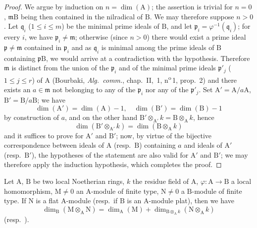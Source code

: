 \begin{proof}
We argue by induction on $n=\dim(\mathrm{A})$; the assertion is trivial for $n=0$, $\mathfrak{m}\mathrm{B}$ being then contained in the nilradical of $\mathrm{B}$.
We may therefore suppose $n>0$.
Let $\mathfrak{q}_i$ ($1\leqslant i\leqslant m$) be the minimal prime ideals of $\mathrm{B}$, and let $\mathfrak{p}_i=\varphi^{-1}(\mathfrak{q}_i)$; for every $i$, we have $\mathfrak{p}_i\neq\mathfrak{m}$; otherwise (since $n>0$) there would exist a prime ideal $\mathfrak{p}\neq\mathfrak{m}$ contained in $\mathfrak{p}_i$ and as $\mathfrak{q}_i$ is minimal among the prime ideals of $\mathrm{B}$ containing $\mathfrak{p}\mathrm{B}$, we would arrive at a contradiction with the hypothesis.
Therefore $\mathfrak{m}$ is distinct from the union of the $\mathfrak{p}_i$ and of the minimal prime ideals $\mathfrak{p}'_j$ ($1\leqslant j\leqslant r$) of $\mathrm{A}$ (Bourbaki, \emph{Alg.\ comm.}, chap.~II, \textsection\,1, n\textsuperscript{o}\,1, prop.~2) and there exists an $a\in\mathfrak{m}$ not belonging to any of the $\mathfrak{p}_i$ nor any of the $\mathfrak{p}'_j$.
Set $\mathrm{A}'=\mathrm{A}/a\mathrm{A}$, $\mathrm{B}'=\mathrm{B}/a\mathrm{B}$; we have 
\[
  \dim(\mathrm{A}')=\dim(\mathrm{A})-1,\quad
  \dim(\mathrm{B}')=\dim(\mathrm{B})-1
\]
by construction of $a$, and on the other hand $\mathrm{B}'\otimes_{\mathrm{A}'}k=\mathrm{B}\otimes_\mathrm{A} k$, hence
\[
  \dim(\mathrm{B}'\otimes_{\mathrm{A}'}k)=\dim(\mathrm{B}\otimes_\mathrm{A} k)
\]
and it suffices to prove  for $\mathrm{A}'$ and $\mathrm{B}'$; now, by virtue of the bijective correspondence between ideals of $\mathrm{A}$ (resp.\ $\mathrm{B}$) containing $a$ and ideals of $\mathrm{A}'$ (resp.\ $\mathrm{B}'$), the hypotheses of the statement are also valid for $\mathrm{A}'$ and $\mathrm{B}'$; we may therefore apply the induction hypothesis, which completes the proof.
\end{proof}

\begin{corollary}[6.1.2]
\label{IV.6.1.2}
Let $\mathrm{A}$, $\mathrm{B}$ be two local Noetherian rings, $k$ the residue field of $\mathrm{A}$, $\varphi:\mathrm{A}\to\mathrm{B}$ a local homomorphism, $\mathrm{M}\neq 0$ an $\mathrm{A}$-module of finite type, $\mathrm{N}\neq 0$ a $\mathrm{B}$-module of finite type.
If $\mathrm{N}$ is a flat $\mathrm{A}$-module \textnormal{(}resp.\ if $\mathrm{B}$ is an $\mathrm{A}$-module plat\textnormal{)}, then we have
\begin{equation}
  \dim_\mathrm{B}(\mathrm{M}\otimes_\mathrm{A}\mathrm{N})=\dim_\mathrm{A}(\mathrm{M})+\dim_{\mathrm{B}\otimes_\mathrm{A} k}(\mathrm{N}\otimes_\mathrm{A} k)
  \tag{6.1.2.1}
\end{equation}
\textnormal{(}resp.\ \textnormal{)}.
\end{corollary}

